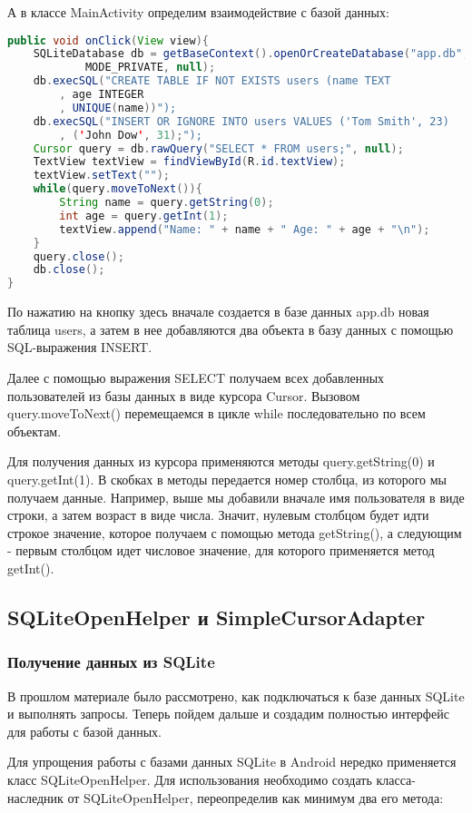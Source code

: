 А в классе MainActivity определим взаимодействие с базой данных:

\begin{lstlisting}[language=Java
	, label=lst:
	]
public void onClick(View view){
	SQLiteDatabase db = getBaseContext().openOrCreateDatabase("app.db",
			MODE_PRIVATE, null);
	db.execSQL("CREATE TABLE IF NOT EXISTS users (name TEXT
		, age INTEGER
		, UNIQUE(name))");
	db.execSQL("INSERT OR IGNORE INTO users VALUES ('Tom Smith', 23)
		, ('John Dow', 31);");
	Cursor query = db.rawQuery("SELECT * FROM users;", null);
	TextView textView = findViewById(R.id.textView);
	textView.setText("");
	while(query.moveToNext()){
		String name = query.getString(0);
		int age = query.getInt(1);
		textView.append("Name: " + name + " Age: " + age + "\n");
	}
	query.close();
	db.close();
}
\end{lstlisting}

По нажатию на кнопку здесь вначале создается в базе данных app.db новая
таблица users, а затем в нее добавляются два объекта в базу данных с
помощью SQL-выражения INSERT.\par
Далее с помощью выражения SELECT получаем всех добавленных
пользователей из базы данных в виде курсора Cursor.
Вызовом query.moveToNext() перемещаемся в цикле while последовательно
по всем объектам.\par
Для получения данных из курсора применяются методы query.getString(0) и
query.getInt(1). В скобках в методы передается номер столбца, из которого
мы получаем данные. Например, выше мы добавили вначале имя
пользователя в виде строки, а затем возраст в виде числа. Значит, нулевым
столбцом будет идти строкое значение, которое получаем с помощью метода
getString(), а следующим - первым столбцом идет числовое значение, для
которого применяется метод getInt().

\subsection{SQLiteOpenHelper и SimpleCursorAdapter}
\subsubsection{Получение данных из SQLite}
В прошлом материале было рассмотрено, как подключаться к базе данных
SQLite и выполнять запросы. Теперь пойдем дальше и создадим полностью
интерфейс для работы с базой данных.\par
Для упрощения работы с базами данных SQLite в Android нередко
применяется класс SQLiteOpenHelper. Для использования необходимо
создать класса-наследник от SQLiteOpenHelper, переопределив как минимум
два его метода:

